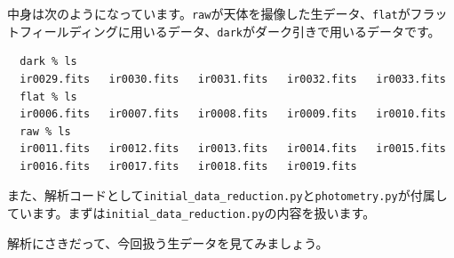 中身は次のようになっています。\texttt{raw}が天体を撮像した生データ、\texttt{flat}がフラットフィールディングに用いるデータ、\texttt{dark}がダーク引きで用いるデータです。
\begin{verbatim}
  dark % ls
  ir0029.fits   ir0030.fits   ir0031.fits   ir0032.fits   ir0033.fits
  flat % ls
  ir0006.fits   ir0007.fits   ir0008.fits   ir0009.fits   ir0010.fits
  raw % ls
  ir0011.fits   ir0012.fits   ir0013.fits   ir0014.fits   ir0015.fits
  ir0016.fits   ir0017.fits   ir0018.fits   ir0019.fits
\end{verbatim}

また、解析コードとして\texttt{initial\_data\_reduction.py}と\texttt{photometry.py}が付属しています。まずは\texttt{initial\_data\_reduction.py}の内容を扱います。\par
解析にさきだって、今回扱う生データを見てみましょう。
